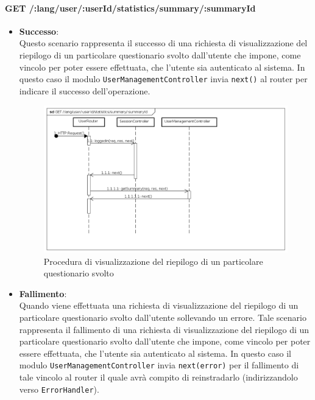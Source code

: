 \paragraph{GET /:lang/user/:userId/statistics/summary/:summaryId}
\begin{itemize}
\item \textbf{Successo}:
\\
Questo scenario rappresenta il successo di una richiesta di visualizzazione del riepilogo di un particolare questionario svolto dall'utente che impone, come vincolo per poter essere effettuata, che l'utente sia autenticato al sistema.  
In questo caso il modulo \texttt{UserManagementController} invia \texttt{next()} al router per indicare il successo dell'operazione.
\label{Procedura di visualizzazione del riepilogo di un particolare questionario svolto}
\begin{figure}[ht]
	\centering
	\includegraphics[scale=0.40]{UML/DiagrammiDiSequenza/Back-end/GET_LangUserUserIdStatisticsSummarySummaryIdSuccess.png}
	\caption{Procedura di visualizzazione del riepilogo di un particolare questionario svolto}
\end{figure}
\FloatBarrier
\item \textbf{Fallimento}:
\\
Quando viene effettuata una richiesta di visualizzazione del riepilogo di un particolare questionario svolto dall'utente sollevando un errore. Tale scenario rappresenta il fallimento di una richiesta di visualizzazione del riepilogo di un particolare questionario svolto dall'utente che impone, come vincolo per poter essere effettuata, che l'utente sia autenticato al sistema. In questo caso il modulo \texttt{UserManagementController} invia \texttt{next(error)} per il fallimento di tale vincolo al router il quale avrà compito di reinstradarlo (indirizzandolo verso \texttt{ErrorHandler}).

\end{itemize}
